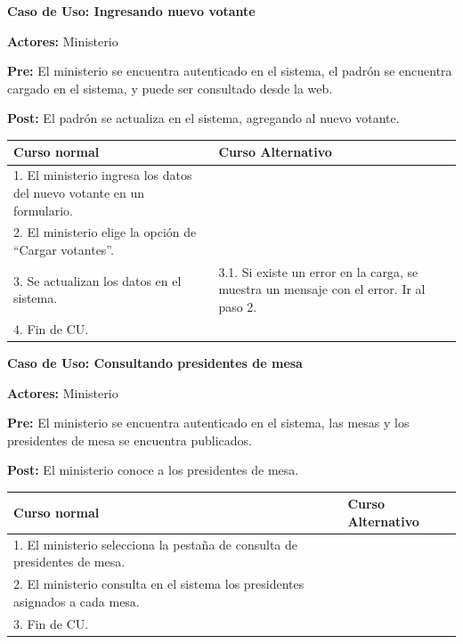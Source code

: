 \textbf{Caso de Uso: Ingresando nuevo votante}

\textbf{Actores:} Ministerio

\textbf{Pre:} El ministerio se encuentra autenticado en el sistema, el padrón se encuentra cargado en el sistema, y puede ser consultado desde la web.

\textbf{Post:} El padrón se actualiza en el sistema, agregando al nuevo votante.
\begin{table}[h!]
	
 \begin{tabular}{|p{7.5cm} | p{7.5cm}|} 
 \hline
 \textbf{Curso normal} & \textbf{Curso Alternativo} \\
 \hline

1. El ministerio ingresa los datos del nuevo votante en un formulario. & \\
\hline

2. El ministerio elige la opción de “Cargar votantes”. & \\
\hline

3. Se actualizan los datos en el sistema. & 3.1. Si existe un error en la carga, se muestra un mensaje con el error. Ir al paso 2. \\
\hline
4. Fin de CU. & \\
 \hline
 \end{tabular}

\end{table}


\textbf{Caso de Uso: Consultando presidentes de mesa}

\textbf{Actores:} Ministerio 

\textbf{Pre:} El ministerio se encuentra autenticado en el sistema, las mesas y los presidentes de mesa se encuentra publicados.

\textbf{Post:} El ministerio conoce a los presidentes de mesa.
\begin{table}[h!]
	
 \begin{tabular}{|p{7.5cm} | p{7.5cm}|} 
 \hline
 \textbf{Curso normal} & \textbf{Curso Alternativo} \\
 \hline

1. El ministerio selecciona la pestaña de consulta de presidentes de mesa. & \\
\hline
2. El ministerio consulta en el sistema los presidentes asignados a cada mesa. & \\
\hline
3. Fin de CU. & \\
\hline
 \end{tabular}

\end{table}

